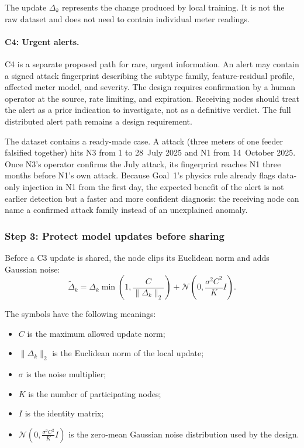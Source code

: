 The update $\Delta_k$ represents the change produced by local training.
It is not the raw dataset and does not need to contain individual
meter readings.

\paragraph{C4: Urgent alerts.}

C4 is a separate proposed path for rare, urgent information. An alert
may contain a signed attack fingerprint describing the subtype family,
feature-residual profile, affected meter model, and severity. The
design requires confirmation by a human operator at the source,
rate limiting, and expiration. Receiving nodes should treat the alert
as a prior indication to investigate, not as a definitive verdict.
The full distributed alert path remains a design requirement.

The dataset contains a ready-made case. A 
attack (three meters of one feeder falsified together) hits N3 from
1 to 28~July 2025 and N1 from 14~October 2025. Once N3's operator
confirms the July attack, its fingerprint reaches N1 three months
before N1's own attack. Because Goal~1's physics rule already flags
data-only injection in N1 from the first day, the expected benefit of
the alert is not earlier detection but a faster and more confident
diagnosis: the receiving node can name a confirmed attack family
instead of an unexplained anomaly.

\subsubsection{Step 3: Protect model updates before sharing}

Before a C3 update is shared, the node clips its Euclidean norm and
adds Gaussian noise:
\begin{equation}
\widetilde{\Delta}_k
=
\Delta_k
\min\!\left(1,\frac{C}{\|\Delta_k\|_2}\right)
+
\mathcal N\!\left(
0,\frac{\sigma^2 C^2}{K}I
\right).
\label{g4-eq:protocol-protected-update}
\end{equation}

The symbols have the following meanings:
\begin{itemize}
    \item $C$ is the maximum allowed update norm;
    \item $\|\Delta_k\|_2$ is the Euclidean norm of the local update;
    \item $\sigma$ is the noise multiplier;
    \item $K$ is the number of participating nodes;
    \item $I$ is the identity matrix;
    \item $\mathcal N(0,\frac{\sigma^2 C^2}{K}I)$ is the
    zero-mean Gaussian noise distribution used by the design.
\end{itemize}


